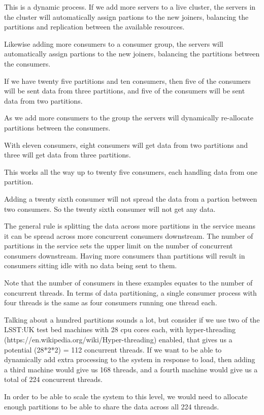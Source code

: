 \documentclass{article}
\begin{document}
This is a dynamic process. If we add more servers to a live cluster, the servers in the cluster
will automatically assign partions to the new joiners, balancing the partitions
and replication between the available resources.

Likewise adding more consumers to a consumer group, the servers will automatically assign
partions to the new joiners, balancing the partitions between the consumers.

If we have twenty five partitions and ten consumers, then five of the consumers will be sent
data from three partitions, and five of the consumers will be sent data from two partitions.

As we add more consumers to the group the servers will dynamically re-allocate
partitions between the consumers.

With eleven consumers, eight consumers will get data from two partitions and
three will get data from three partitions.

This works all the way up to twenty five consumers, each handling data from one partition.

Adding a twenty sixth consumer will not spread the data from a partion between two
consumers. So the twenty sixth consumer will not get any data.

The general rule is splitting the data across more partitions in the service means it can be spread
across more concurrent consumers downstream.
The number of partitions in the service sets the upper limit on the number of concurrent
consumers downstream.
Having more consumers than partitions will result in consumers sitting idle with no data being sent to them.

Note that the number of consumers in these examples equates to the number of concurrent threads.
In terms of data partitioning, a single consumer process with four threads is the same as
four consumers running one thread each.

Talking about a hundred partitions sounds a lot, but consider if we use two of the LSST:UK test bed machines
with 28 cpu cores each, with hyper-threading (https://en.wikipedia.org/wiki/Hyper-threading) enabled,
that gives us a potential (28*2*2) = 112 concurrent threads.
If we want to be able to dynamically add extra processing to the system in response to load, then
adding a third machine would give us 168 threads, and a fourth machine would give us a total of 224
concurrent threads.

In order to be able to scale the system to this level, we would need to allocate enough partitions
to be able to share the data across all 224 threads.
\end{document}
